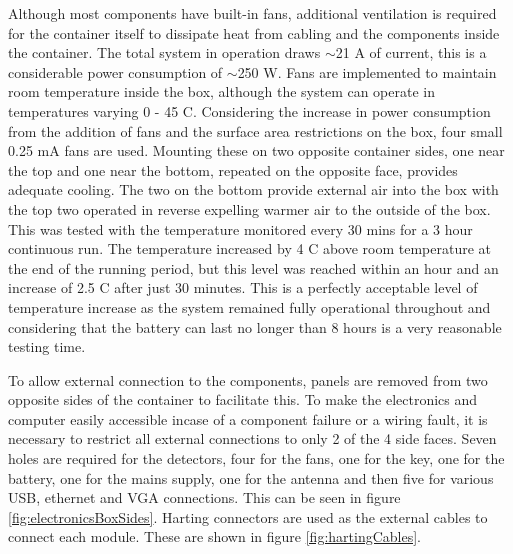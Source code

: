 Although most components have built-in fans, additional ventilation is required for the container itself to dissipate heat from cabling and the components inside the container. The total system in operation draws $\sim$21 A of current, this is a considerable power consumption of $\sim$250 W. Fans are implemented to maintain room temperature inside the box, although the system can operate in temperatures varying 0 - 45 \textdegree C. Considering the increase in power consumption from the addition of fans and the surface area restrictions on the box, four small 0.25 mA fans are used. Mounting these on two opposite container sides, one near the top and one near the bottom, repeated on the opposite face, provides adequate cooling. The two on the bottom provide external air into the box with the top two operated in reverse expelling warmer air to the outside of the box. This was tested with the temperature monitored every 30 mins for a 3 hour continuous run. The temperature increased by 4 \textdegree C above room temperature at the end of the running period, but this level was reached within an hour and an increase of 2.5 \textdegree C after just 30 minutes. This is a perfectly acceptable level of temperature increase as the system remained fully operational throughout and considering that the battery can last no longer than 8 hours is a very reasonable testing time.

To allow external connection to the components, panels are removed from two opposite sides of the container to facilitate this. To make the electronics and computer easily accessible incase of a component failure or a wiring fault, it is necessary to restrict all external connections to only 2 of the 4 side faces. Seven holes are required for the detectors, four for the fans, one for the key, one for the battery, one for the mains supply, one for the antenna and then five for various USB, ethernet and VGA connections. This can be seen in figure \ref{fig:electronicsBoxSides}. Harting connectors are used as the external cables to connect each module. These are shown in figure \ref{fig:hartingCables}.

